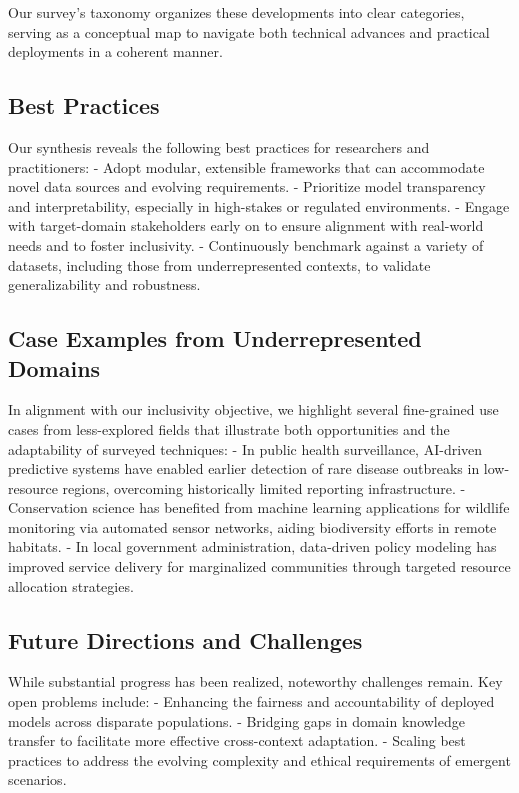 \documentclass[sigconf]{acmart}
\begin{document}
Our survey's taxonomy organizes these developments into clear categories, serving as a conceptual map to navigate both technical advances and practical deployments in a coherent manner.

\subsection{Best Practices}

Our synthesis reveals the following best practices for researchers and practitioners:
- Adopt modular, extensible frameworks that can accommodate novel data sources and evolving requirements.
- Prioritize model transparency and interpretability, especially in high-stakes or regulated environments.
- Engage with target-domain stakeholders early on to ensure alignment with real-world needs and to foster inclusivity.
- Continuously benchmark against a variety of datasets, including those from underrepresented contexts, to validate generalizability and robustness.

\subsection{Case Examples from Underrepresented Domains}

In alignment with our inclusivity objective, we highlight several fine-grained use cases from less-explored fields that illustrate both opportunities and the adaptability of surveyed techniques:
- In public health surveillance, AI-driven predictive systems have enabled earlier detection of rare disease outbreaks in low-resource regions, overcoming historically limited reporting infrastructure.
- Conservation science has benefited from machine learning applications for wildlife monitoring via automated sensor networks, aiding biodiversity efforts in remote habitats.
- In local government administration, data-driven policy modeling has improved service delivery for marginalized communities through targeted resource allocation strategies.

\subsection{Future Directions and Challenges}

While substantial progress has been realized, noteworthy challenges remain. Key open problems include:
- Enhancing the fairness and accountability of deployed models across disparate populations.
- Bridging gaps in domain knowledge transfer to facilitate more effective cross-context adaptation.
- Scaling best practices to address the evolving complexity and ethical requirements of emergent scenarios.
\end{document}
